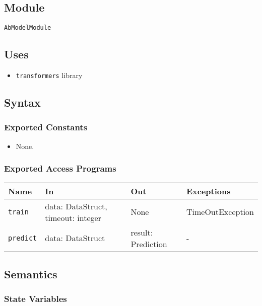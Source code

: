 \documentclass[12pt, titlepage]{article}
\begin{document}
\subsection{Module}

\texttt{AbModelModule}

\subsection{Uses}

\begin{itemize}
    \item \texttt{transformers} library
\end{itemize}

\subsection{Syntax}

\subsubsection{Exported Constants}

\begin{itemize}
    \item None.
\end{itemize}

\subsubsection{Exported Access Programs}

\begin{center}
\begin{tabular}{p{5cm} p{3.5cm} p{3.5cm} p{2cm}}
\hline
\textbf{Name} & \textbf{In} & \textbf{Out} & \textbf{Exceptions} \\
\hline
\texttt{train} & data: DataStruct, timeout: integer & None & TimeOutException \\
\texttt{predict} & data: DataStruct & result: Prediction & - \\
\hline
\end{tabular}
\end{center}

\subsection{Semantics}

\subsubsection{State Variables}
\end{document}
